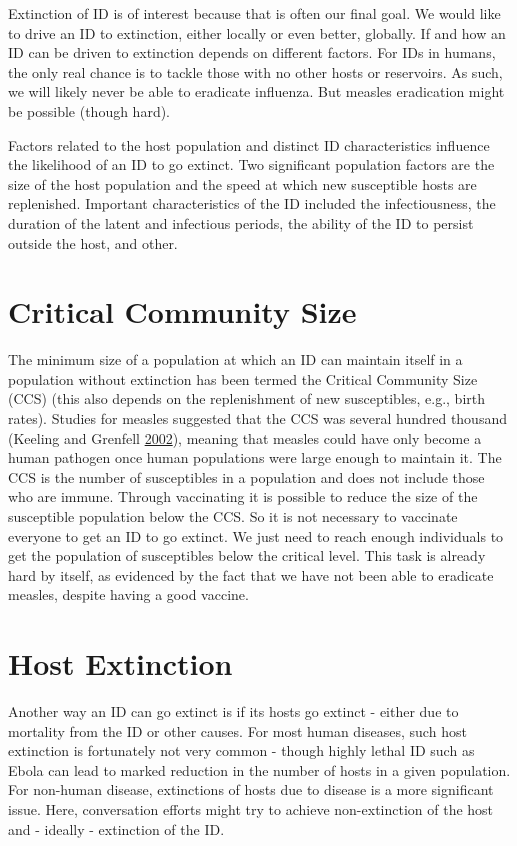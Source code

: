 \documentclass[]{book}
\theoremstyle{definition}
\theoremstyle{definition}
\theoremstyle{definition}
\theoremstyle{remark}
\begin{document}
Extinction of ID is of interest because that is often our final goal. We
would like to drive an ID to extinction, either locally or even better,
globally. If and how an ID can be driven to extinction depends on
different factors. For IDs in humans, the only real chance is to tackle
those with no other hosts or reservoirs. As such, we will likely never
be able to eradicate influenza. But measles eradication might be
possible (though hard).

Factors related to the host population and distinct ID characteristics
influence the likelihood of an ID to go extinct. Two significant
population factors are the size of the host population and the speed at
which new susceptible hosts are replenished. Important characteristics
of the ID included the infectiousness, the duration of the latent and
infectious periods, the ability of the ID to persist outside the host,
and other.

\section{Critical Community Size}\label{critical-community-size}

The minimum size of a population at which an ID can maintain itself in a
population without extinction has been termed the Critical Community
Size (CCS) (this also depends on the replenishment of new susceptibles,
e.g., birth rates). Studies for measles suggested that the CCS was
several hundred thousand (Keeling and Grenfell
\protect\hyperlink{ref-keeling02}{2002}), meaning that measles could
have only become a human pathogen once human populations were large
enough to maintain it. The CCS is the number of susceptibles in a
population and does not include those who are immune. Through
vaccinating it is possible to reduce the size of the susceptible
population below the CCS. So it is not necessary to vaccinate everyone
to get an ID to go extinct. We just need to reach enough individuals to
get the population of susceptibles below the critical level. This task
is already hard by itself, as evidenced by the fact that we have not
been able to eradicate measles, despite having a good vaccine.

\section{Host Extinction}\label{host-extinction}

Another way an ID can go extinct is if its hosts go extinct - either due
to mortality from the ID or other causes. For most human diseases, such
host extinction is fortunately not very common - though highly lethal ID
such as Ebola can lead to marked reduction in the number of hosts in a
given population. For non-human disease, extinctions of hosts due to
disease is a more significant issue. Here, conversation efforts might
try to achieve non-extinction of the host and - ideally - extinction of
the ID.
\end{document}
